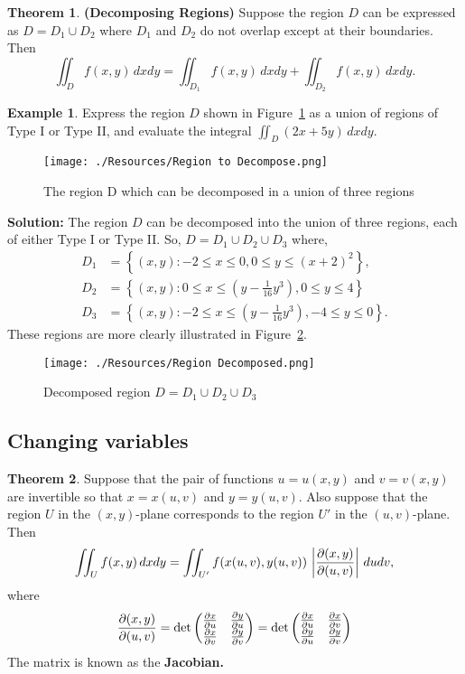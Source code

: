 \documentclass[12pt, a4paper]{article}
\theoremstyle{definition}
\newtheorem{theorem}{Theorem}[section]
\newtheorem*{example}{Example}
\theoremstyle{plain}
\begin{document}
\begin{theorem}
\textbf{(Decomposing Regions)} Suppose the region $D$ can be expressed as $D = D_1 \cup D_2$ where $D_1$ and $D_2$ do not overlap except at their boundaries. Then $$\iint_D f(x,y) \, dxdy = \iint_{D_1} f(x,y) \,dxdy+\iint_{D_2} f(x,y) \,dxdy.$$
\end{theorem}

\begin{example}
Express the region $D$ shown in Figure~\ref{fig:Region Decomposition} as a union of regions of Type I or Type II, and evaluate the integral $\iint_D (2x+5y) \, dxdy.$

\begin{figure}[H]
\centering
\texttt{[image: ./Resources/Region to Decompose.png]}
\caption{The region D which can be decomposed in a union of three regions}
\label{fig:Region Decomposition}
\end{figure}
\end{example}

\textbf{Solution:} The region $D$ can be decomposed into the union of three regions, each of either Type I or Type II. So, $D=D_1\cup D_2 \cup D_3$ where, $$\begin{aligned}
D_1&=\left\{(x,y):-2\leq x\leq 0, 0 \leq y \leq (x+2)^2\right\}, \\
D_2&=\left\{(x,y): 0\leq x \leq \left(y-\frac{1}{16}y^3\right), 0\leq y \leq 4\right\} \\
D_3&=\left\{(x,y): -2 \leq x \leq \left(y-\frac{1}{16}y^3\right), -4\leq y \leq 0\right\}.
\end{aligned}$$ 
These regions are more clearly illustrated in Figure~\ref{fig:Decomposed region}.

\begin{figure}[H]
\centering
\texttt{[image: ./Resources/Region Decomposed.png]}
\caption{Decomposed region $D=D_1 \cup D_2 \cup D_3$}
\label{fig:Decomposed region}
\end{figure}

\subsection{Changing variables}

\begin{theorem}
Suppose that the pair of functions $u = u(x, y)$ and $v = v(x, y)$ are invertible so that $x = x(u, v)$ and $y = y(u, v).$ Also suppose that the region $U$ in the $(x, y)$-plane corresponds to the region $U'$ in the $(u,v)$-plane. Then $$\iint_U f(x,y) \, dxdy = \iint_{U'} f(x(u,v),y(u,v)) \, \left| \pdv{(x,y)}{(u,v)} \right| \, dudv,$$ where $$\pdv{(x,y)}{(u,v)} = \det \begin{pmatrix} \pdv{x}{u} & \pdv{y}{u} \\ \pdv{x}{v} & \pdv{y}{v} \end{pmatrix}=\det\begin{pmatrix} \pdv{x}{u} & \pdv{x}{v} \\ \pdv{y}{u} & \pdv{y}{v} \end{pmatrix}$$ The matrix is known as the \textbf{Jacobian.}
\end{theorem}
\end{document}
